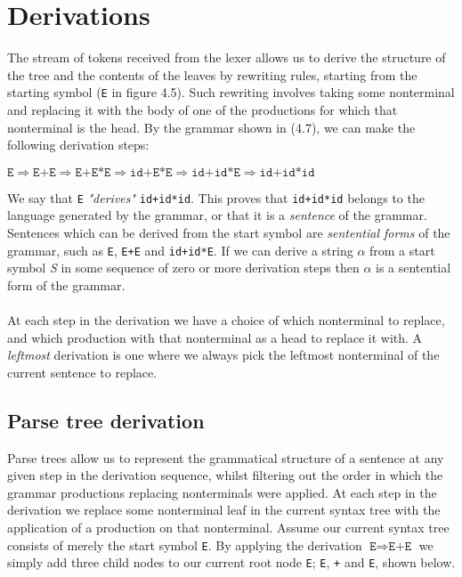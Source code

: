 \documentclass[a4paper, 11pt]{article}
\begin{document}
\section{Derivations}
The stream of tokens received from the lexer allows us to derive the structure of the tree and the contents of the leaves by rewriting rules, starting from the starting symbol (\texttt{E} in figure 4.5). Such rewriting involves taking some nonterminal and replacing it with the body of one of the productions for which that nonterminal is the head. By the grammar shown in (4.7), we can make the following derivation steps: 
\begin{center}
$\texttt{E} \Rightarrow \texttt{E+E} \Rightarrow \texttt{E+E*E} \Rightarrow \texttt{id+E*E} \Rightarrow \texttt{id+id*E} \Rightarrow \texttt{id+id*id}$
\end{center}
We say that \texttt{E} \textit{"derives"} \texttt{id+id*id}. This proves that \texttt{id+id*id} belongs to the language generated by the grammar, or that it is a \textit{sentence} of the grammar. Sentences which can be derived from the start symbol are \textit{sentential forms} of the grammar, such as \texttt{E}, \texttt{E+E} and \texttt{id+id*E}. If we can derive a string $\alpha$ from a start symbol \textit{S} in some sequence of zero or more derivation steps then $\alpha$ is a sentential form of the grammar.
\\\\
At each step in the derivation we have a choice of which nonterminal to replace, and which production with that nonterminal as a head to replace it with. A \textit{leftmost} derivation is one where we always pick the leftmost nonterminal of the current sentence to replace.

\subsection{Parse tree derivation}
Parse trees allow us to represent the grammatical structure of a sentence at any given step in the derivation sequence, whilst filtering out the order in which the grammar productions replacing nonterminals were applied. At each step in the derivation we replace some nonterminal leaf in the current syntax tree with the application of a production on that nonterminal. Assume our current syntax tree consists of merely the start symbol \texttt{E}. By applying the derivation $\texttt{E} \Rightarrow \texttt{E+E}$ we simply add three child nodes to our current root node \texttt{E}; \texttt{E}, \texttt{+} and \texttt{E}, shown below.
\end{document}
